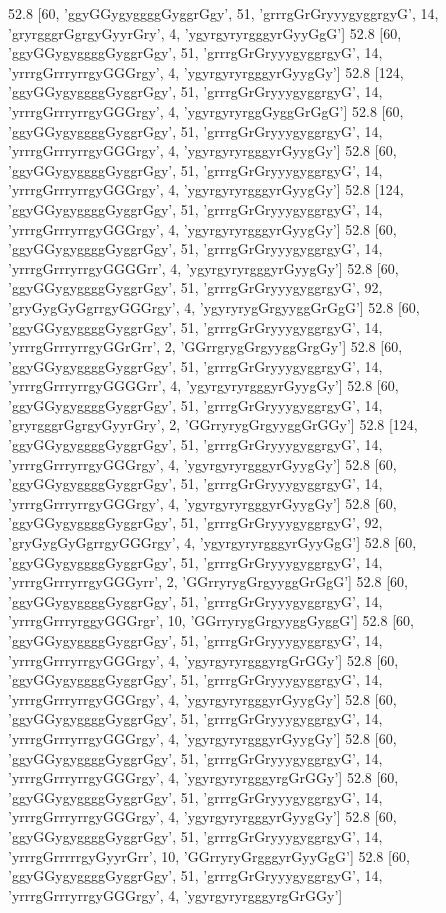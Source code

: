 52.8 [60, 'ggyGGygyggggGyggrGgy', 51, 'grrrgGrGryyygyggrgyG', 14, 'gryrgggrGgrgyGyyrGry', 4, 'ygyrgyryrgggyrGyyGgG']
52.8 [60, 'ggyGGygyggggGyggrGgy', 51, 'grrrgGrGryyygyggrgyG', 14, 'yrrrgGrrryrrgyGGGrgy', 4, 'ygyrgyryrgggyrGyygGy']
52.8 [124, 'ggyGGygyggggGyggrGgy', 51, 'grrrgGrGryyygyggrgyG', 14, 'yrrrgGrrryrrgyGGGrgy', 4, 'ygyrgyryrggGyggGrGgG']
52.8 [60, 'ggyGGygyggggGyggrGgy', 51, 'grrrgGrGryyygyggrgyG', 14, 'yrrrgGrrryrrgyGGGrgy', 4, 'ygyrgyryrgggyrGyygGy']
52.8 [60, 'ggyGGygyggggGyggrGgy', 51, 'grrrgGrGryyygyggrgyG', 14, 'yrrrgGrrryrrgyGGGrgy', 4, 'ygyrgyryrgggyrGyygGy']
52.8 [124, 'ggyGGygyggggGyggrGgy', 51, 'grrrgGrGryyygyggrgyG', 14, 'yrrrgGrrryrrgyGGGrgy', 4, 'ygyrgyryrgggyrGyygGy']
52.8 [60, 'ggyGGygyggggGyggrGgy', 51, 'grrrgGrGryyygyggrgyG', 14, 'yrrrgGrrryrrgyGGGGrr', 4, 'ygyrgyryrgggyrGyygGy']
52.8 [60, 'ggyGGygyggggGyggrGgy', 51, 'grrrgGrGryyygyggrgyG', 92, 'gryGygGyGgrrgyGGGrgy', 4, 'ygyryrygGrgyyggGrGgG']
52.8 [60, 'ggyGGygyggggGyggrGgy', 51, 'grrrgGrGryyygyggrgyG', 14, 'yrrrgGrrryrrgyGGrGrr', 2, 'GGrrgrygGrgyyggGrgGy']
52.8 [60, 'ggyGGygyggggGyggrGgy', 51, 'grrrgGrGryyygyggrgyG', 14, 'yrrrgGrrryrrgyGGGGrr', 4, 'ygyrgyryrgggyrGyygGy']
52.8 [60, 'ggyGGygyggggGyggrGgy', 51, 'grrrgGrGryyygyggrgyG', 14, 'gryrgggrGgrgyGyyrGry', 2, 'GGrryrygGrgyyggGrGGy']
52.8 [124, 'ggyGGygyggggGyggrGgy', 51, 'grrrgGrGryyygyggrgyG', 14, 'yrrrgGrrryrrgyGGGrgy', 4, 'ygyrgyryrgggyrGyygGy']
52.8 [60, 'ggyGGygyggggGyggrGgy', 51, 'grrrgGrGryyygyggrgyG', 14, 'yrrrgGrrryrrgyGGGrgy', 4, 'ygyrgyryrgggyrGyygGy']
52.8 [60, 'ggyGGygyggggGyggrGgy', 51, 'grrrgGrGryyygyggrgyG', 92, 'gryGygGyGgrrgyGGGrgy', 4, 'ygyrgyryrgggyrGyyGgG']
52.8 [60, 'ggyGGygyggggGyggrGgy', 51, 'grrrgGrGryyygyggrgyG', 14, 'yrrrgGrrryrrgyGGGyrr', 2, 'GGrryrygGrgyyggGrGgG']
52.8 [60, 'ggyGGygyggggGyggrGgy', 51, 'grrrgGrGryyygyggrgyG', 14, 'yrrrgGrrryrggyGGGrgr', 10, 'GGrryrygGrgyyggGyggG']
52.8 [60, 'ggyGGygyggggGyggrGgy', 51, 'grrrgGrGryyygyggrgyG', 14, 'yrrrgGrrryrrgyGGGrgy', 4, 'ygyrgyryrgggyrgGrGGy']
52.8 [60, 'ggyGGygyggggGyggrGgy', 51, 'grrrgGrGryyygyggrgyG', 14, 'yrrrgGrrryrrgyGGGrgy', 4, 'ygyrgyryrgggyrGyygGy']
52.8 [60, 'ggyGGygyggggGyggrGgy', 51, 'grrrgGrGryyygyggrgyG', 14, 'yrrrgGrrryrrgyGGGrgy', 4, 'ygyrgyryrgggyrGyygGy']
52.8 [60, 'ggyGGygyggggGyggrGgy', 51, 'grrrgGrGryyygyggrgyG', 14, 'yrrrgGrrryrrgyGGGrgy', 4, 'ygyrgyryrgggyrgGrGGy']
52.8 [60, 'ggyGGygyggggGyggrGgy', 51, 'grrrgGrGryyygyggrgyG', 14, 'yrrrgGrrryrrgyGGGrgy', 4, 'ygyrgyryrgggyrGyygGy']
52.8 [60, 'ggyGGygyggggGyggrGgy', 51, 'grrrgGrGryyygyggrgyG', 14, 'yrrrgGrrrrrgyGyyrGrr', 10, 'GGrryryGrgggyrGyyGgG']
52.8 [60, 'ggyGGygyggggGyggrGgy', 51, 'grrrgGrGryyygyggrgyG', 14, 'yrrrgGrrryrrgyGGGrgy', 4, 'ygyrgyryrgggyrgGrGGy']
